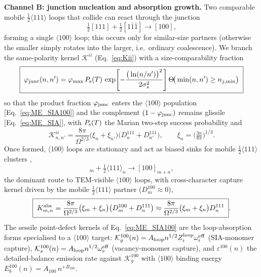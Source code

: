 \textbf{Channel B: junction nucleation and absorption growth.}
\label{sec:channel-B}
Two comparable mobile $\tfrac12\langle111\rangle$ loops that collide can react
through the junction \citep{EyreBullough1965,Marian2002}
\begin{equation}
  \tfrac12[111] + \tfrac12[1\bar1\bar1] \rightarrow [100],
  \label{eq:junction}
\end{equation}
forming a single $\langle100\rangle$ loop; this occurs only for similar-size
partners (otherwise the smaller simply rotates into the larger, i.e.\ ordinary
coalescence). We branch the same-polarity kernel $\mathcal{K}^{ii}$
(Eq.~\ref{eq:Kii}) with a size-comparability fraction
\begin{equation}
  \boxed{\;\varphi_{\rm junc}(n,n') = \varphi_{\max}\,P_{\rm s}(T)\,
  \exp\!\left[-\frac{\big(\ln(n/n')\big)^2}{2\sigma_s^2}\right]
  \Theta\!\big(\min(n,n')\ge n_{j,\min}\big)\;}
  \label{eq:phi-junc}
\end{equation}
so that the product fraction $\varphi_{\rm junc}$ enters the $\langle100\rangle$
population [Eq.~\eqref{eq:ME_SIA100}] and the complement $(1-\varphi_{\rm junc})$
remains glissile [Eq.~\eqref{eq:ME_SIA}], with $P_{\rm s}(T)$ the Marian
two-step success probability and
\begin{equation}
  \mathcal K^{ii}_{n,n'} = \frac{8\pi}{\Omega^{2/3}}
  \big(\xi_n+\xi_{n'}\big)\big(D^{111}_n+D^{111}_{n'}\big),\qquad
  \xi_n=\Big(\tfrac{3n}{8\pi}\Big)^{1/3}.
  \label{eq:Kii}
\end{equation}
Once formed, $\langle100\rangle$ loops are stationary and act as biased sinks
for mobile $\tfrac12\langle111\rangle$ clusters \citep{Marian2002},
\begin{equation}
  [100]_m + \tfrac12\langle111\rangle_n \rightarrow [100]_{m+n},
  \label{eq:absorption}
\end{equation}
the dominant route to TEM-visible $\langle100\rangle$ loops, with cross-character
capture kernel driven by the mobile $\tfrac12\langle111\rangle$ partner
($D^{100}_m\approx0$),
\begin{equation}
  \boxed{\;K^{\rm abs}_{m,n} = \frac{8\pi}{\Omega^{2/3}}
  \big(\xi_m+\xi_n\big)\big(D^{100}_m+D^{111}_n\big)
  \approx \frac{8\pi}{\Omega^{2/3}}\big(\xi_m+\xi_n\big)D^{111}_n\;}.
  \label{eq:Kabs}
\end{equation}
The sessile point-defect kernels of Eq.~\eqref{eq:ME_SIA100} are the
loop-absorption forms specialised to a $\langle100\rangle$ target:
$\mathcal{K}^{100}_g(n)=A_{\rm loop}n^{1/2}Z_i^{\rm loop}\omega_i^{\rm eff}$
(SIA-monomer capture), $\mathcal{K}^{100}_s(n)=A_{\rm loop}n^{1/2}\omega_v^{\rm eff}$
(vacancy-monomer capture), and $\varepsilon^{100}(n)$ the detailed-balance
emission rate against $\mathcal{K}^{100}_g$ with $\langle100\rangle$ binding
energy $E_b^{100}(n)=A_{100}\,n^{+B_{100}}$.%

